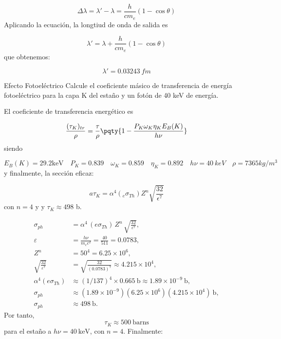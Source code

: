 \begin{equation}
    \Delta \lambda = \lambda'-\lambda = \frac{h}{cm_e}(1-\cos \theta) 
\end{equation}
Aplicando la ecuación, la longtiud de onda de salida es

\begin{equation}
    \lambda' = \lambda + \frac{h}{cm_e} (1-\cos \theta)
\end{equation}
que obtenemos: 

\begin{equation}
    \lambda' = 0.03243 \ \unit{fm}
\end{equation}


\begin{Ejercicio}{Efecto Fotoeléctrico}
    Calcule el coeficiente másico de transferencia de energía fotoeléctrico para la capa K del estaño y un fotón de 40 keV de energía.
\end{Ejercicio}

El coeficiente de transferencia energético es 

\begin{equation}
    \frac{(\tau_K)_{tr}}{\rho} = \frac{\tau}{\rho} \pqty{1-\frac{P_K\omega_K\eta_K E_B(K)}{h \nu}}
\end{equation}
siendo

\begin{equation}
    E_B (K) = 29.2 \text{keV} \quad  P_K = 0.839 \quad \omega_K = 0.859 \quad \eta_K =0.892 \quad h \nu = 40 \ \unit{keV} \quad \rho = 7365 \unit{kg/m^3}
\end{equation}
y finalmente, la sección eficaz: 

\begin{equation}
    a\tau_K = \alpha^4 (_e \sigma_{Th}) Z^n  \sqrt{\frac{32}{\epsilon^7}}
\end{equation}
con $n=4$ y y $\tau_K \approx 498$ b. 

\begin{align}
    \sigma_{ph} &= \alpha^4 \, (e\sigma_{Th}) \, Z^n \, \sqrt{\frac{32}{\varepsilon^7}}, \\[1ex]
    \varepsilon &= \frac{h\nu}{m_e c^2} = \frac{40}{511} = 0.0783, \\[1ex]
    Z^n &= 50^4 = 6.25 \times 10^6, \\[1ex]
    \sqrt{\frac{32}{\varepsilon^7}} &= \sqrt{\frac{32}{(0.0783)^7}} \approx 4.215 \times 10^4, \\[1ex]
    \alpha^4 (e\sigma_{Th}) &\approx (1/137)^4 \times 0.665\ \text{b} 
    \approx 1.89 \times 10^{-9}\ \text{b}, \\[1ex]
    \sigma_{ph} &\approx (1.89 \times 10^{-9})(6.25 \times 10^6)(4.215 \times 10^4)\ \text{b}, \\[1ex]
    \sigma_{ph} &\approx 498\ \text{b}.
\end{align}
Por tanto,
\[
    {\tau_K \approx 500\ \text{barns}}
\]
para el estaño a \(h\nu = 40\ \text{keV}\), con \(n=4\). Finalmente: 

